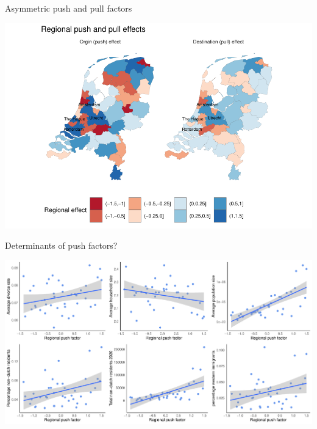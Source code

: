 \documentclass{beamer}
\begin{document}
\begin{frame}{Asymmetric push and pull factors}
	\begin{center}
	\includegraphics[width=1\textwidth]{../../fig/regional_effects}
\end{center}
\end{frame}

\begin{frame}{Determinants of push factors?}
	\begin{center}
		\includegraphics[width=1\textwidth]{../../fig/regional_out_plot}
	\end{center}
\end{frame}
\end{document}
